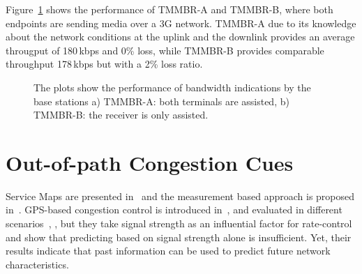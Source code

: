 Figure~\ref{fig:tmmbn} shows the performance of TMMBR-A and TMMBR-B, where
both endpoints are sending media over a 3G network. TMMBR-A due to its
knowledge about the network conditions at the uplink and the downlink provides
an average througput of 180\,kbps and 0\% loss, while TMMBR-B provides
comparable throughput 178\,kbps but with a 2\% loss ratio.


\begin{figure}
  \centerline{
  }
  \caption{The plots show the performance of bandwidth indications by the base
  stations a) TMMBR-A: both terminals are assisted, b) TMMBR-B: the receiver
  is only assisted.}
  \label{fig:tmmbn}
\end{figure}


\section{Out-of-path Congestion Cues}


Service Maps are presented in~\cite{1630563} and the measurement based
approach is proposed in~\cite{Aravinda:2008p14}. GPS-based congestion control
is introduced in~\cite{Yao:2008p21}, and evaluated in different
scenarios~\cite{Yao:2009p57}, \cite{Yao:2010p64}, but they take signal
strength as an influential factor for rate-control and show that predicting
based on signal strength alone is insufficient. Yet, their results indicate
that past information can be used to predict future network characteristics.

